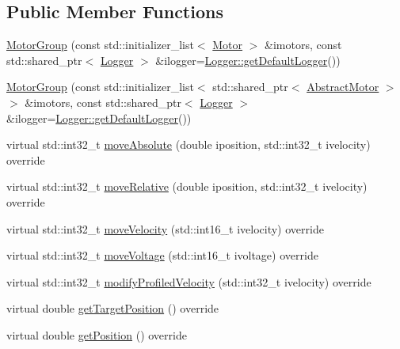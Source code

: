 \subsection*{Public Member Functions}
\begin{DoxyCompactItemize}
\item 
\mbox{\hyperlink{classokapi_1_1MotorGroup_a6bc96434556403fecf7e715faa6359f9}{Motor\+Group}} (const std\+::initializer\+\_\+list$<$ \mbox{\hyperlink{classokapi_1_1Motor}{Motor}} $>$ \&imotors, const std\+::shared\+\_\+ptr$<$ \mbox{\hyperlink{classokapi_1_1Logger}{Logger}} $>$ \&ilogger=\mbox{\hyperlink{classokapi_1_1Logger_a5053cf778b4b55acba788a3797dc96d2}{Logger\+::get\+Default\+Logger}}())
\item 
\mbox{\hyperlink{classokapi_1_1MotorGroup_a7b0d2c64bb1c78c117160b8dfeb07611}{Motor\+Group}} (const std\+::initializer\+\_\+list$<$ std\+::shared\+\_\+ptr$<$ \mbox{\hyperlink{classokapi_1_1AbstractMotor}{Abstract\+Motor}} $>$$>$ \&imotors, const std\+::shared\+\_\+ptr$<$ \mbox{\hyperlink{classokapi_1_1Logger}{Logger}} $>$ \&ilogger=\mbox{\hyperlink{classokapi_1_1Logger_a5053cf778b4b55acba788a3797dc96d2}{Logger\+::get\+Default\+Logger}}())
\item 
virtual std\+::int32\+\_\+t \mbox{\hyperlink{classokapi_1_1MotorGroup_afe6800639a995d37d8963c72fb8526d4}{move\+Absolute}} (double iposition, std\+::int32\+\_\+t ivelocity) override
\item 
virtual std\+::int32\+\_\+t \mbox{\hyperlink{classokapi_1_1MotorGroup_a4295103133b5cb721dfb457a8cc8c2bc}{move\+Relative}} (double iposition, std\+::int32\+\_\+t ivelocity) override
\item 
virtual std\+::int32\+\_\+t \mbox{\hyperlink{classokapi_1_1MotorGroup_a9f31c14e92efe7ab492b2c335c51b488}{move\+Velocity}} (std\+::int16\+\_\+t ivelocity) override
\item 
virtual std\+::int32\+\_\+t \mbox{\hyperlink{classokapi_1_1MotorGroup_acebebe160f2c733ee497b1b8b50b0781}{move\+Voltage}} (std\+::int16\+\_\+t ivoltage) override
\item 
virtual std\+::int32\+\_\+t \mbox{\hyperlink{classokapi_1_1MotorGroup_a616f20db24f1eff4d3641b86faef4fbd}{modify\+Profiled\+Velocity}} (std\+::int32\+\_\+t ivelocity) override
\item 
virtual double \mbox{\hyperlink{classokapi_1_1MotorGroup_ad6332111f8b2642bc13fbd8822328121}{get\+Target\+Position}} () override
\item 
virtual double \mbox{\hyperlink{classokapi_1_1MotorGroup_a6bf3c5a2f5caf0e5b02e8dcf2e8130d9}{get\+Position}} () override
$$
\end{DoxyCompactItemize}
